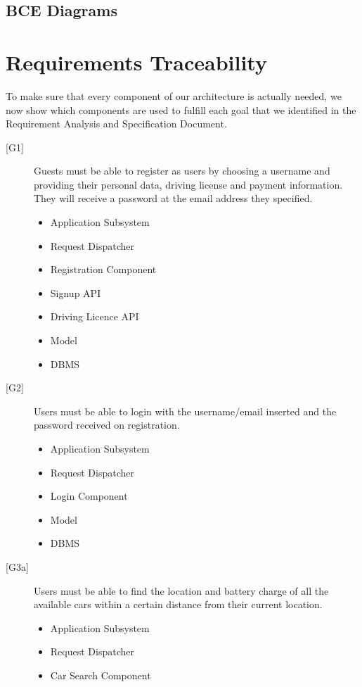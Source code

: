 \documentclass[english]{article}
\begin{document}
\subsection{BCE Diagrams}

\newpage

\section{Requirements Traceability}
To make sure that every component of our architecture is actually needed, we now show which components are used to fulfill each goal that we identified in the Requirement Analysis and Specification Document.

\begin{description}
	\item[{[G1]}]{Guests must be able to register as users by choosing a username and providing their personal data, driving license and payment information. They will receive a password at the email address they specified.}
	\begin{itemize}
		\item{Application Subsystem}
		\item{Request Dispatcher}
		\item{Registration Component}
		\item{Signup API}
		\item{Driving Licence API}
		\item{Model}
		\item{DBMS}
	\end{itemize}
	\item[{[G2]}]{Users must be able to login with the username/email inserted and the password received on registration.}
	\begin{itemize}
		\item{Application Subsystem}
		\item{Request Dispatcher}
		\item{Login Component}
		\item{Model}
		\item{DBMS}
	\end{itemize}
	\item[{[G3a]}]{Users must be able to find the location and battery charge of all the available cars within a certain distance from their current location.}
	\begin{itemize}
		\item{Application Subsystem}
		\item{Request Dispatcher}
		\item{Car Search Component}

\end{itemize}
\end{description}
\end{document}
